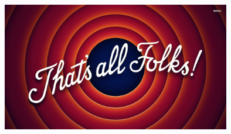 \documentclass[10pt]{beamer}
\begin{document}
\begin{frame}
\begin{figure}
\centering
\includegraphics[width = 10cm]{images/taf.jpg}
\end{figure}
\end{frame}
\end{document}
